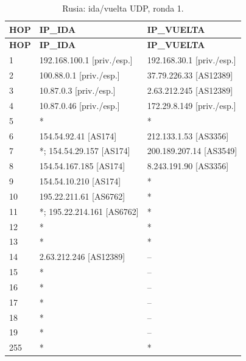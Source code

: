 \fontsize{9}{11}\selectfont
\begin{longtable}{p{0.95cm}p{7.075cm}p{7.075cm}}
\caption{Rusia: ida/vuelta UDP, ronda 1.}\label{anexo:vuelta:37.79.226.46:UDP:1} \\
\toprule
\textbf{HOP} & \textbf{IP\_\allowbreak{}IDA} & \textbf{IP\_\allowbreak{}VUELTA} \\ \midrule
\endfirsthead
\toprule
\textbf{HOP} & \textbf{IP\_\allowbreak{}IDA} & \textbf{IP\_\allowbreak{}VUELTA} \\ \midrule
\endhead
1 & 192.168.100.1 [priv./esp.] & 192.168.30.1 [priv./esp.] \\
2 & 100.88.0.1 [priv./esp.] & 37.79.226.33 [AS12389] \\
3 & 10.87.0.3 [priv./esp.] & 2.63.212.245 [AS12389] \\
4 & 10.87.0.46 [priv./esp.] & 172.29.8.149 [priv./esp.] \\
5 & * & * \\
6 & 154.54.92.41 [AS174] & 212.133.1.53 [AS3356] \\
7 & *; 154.54.29.157 [AS174] & 200.189.207.14 [AS3549] \\
8 & 154.54.167.185 [AS174] & 8.243.191.90 [AS3356] \\
9 & 154.54.10.210 [AS174] & * \\
10 & 195.22.211.61 [AS6762] & * \\
11 & *; 195.22.214.161 [AS6762] & * \\
12 & * & * \\
13 & * & * \\
14 & 2.63.212.246 [AS12389] & -- \\
15 & * & -- \\
16 & * & -- \\
17 & * & -- \\
18 & * & -- \\
19 & * & -- \\
255 & * & * \\
\bottomrule
\end{longtable}
\endgroup
\begingroup
\fontsize{9}{11}\selectfont
